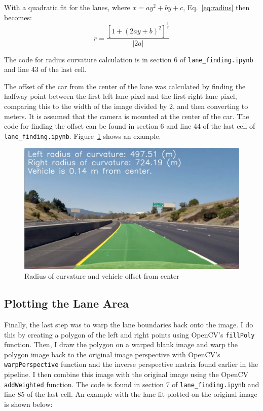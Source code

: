 \documentclass[12pt]{article}
\begin{document}
With a quadratic fit for the lanes, where $x = ay^2 + by + c$, Eq.~\ref{eq:radius} then becomes:
\begin{equation}
r = \frac{[1+(2ay + b)^2]^\frac{3}{2}}{|2a|}
\end{equation}

The code for radius curvature calculation is in section 6 of \texttt{lane\_finding.ipynb} and line 43 of the last cell.

The offset of the car from the center of the lane was calculated by finding the halfway point between the first left lane pixel and the first right lane pixel, comparing this to the width of the image divided by 2, and then converting to meters. It is assumed that the camera is mounted at the center of the car. The code for finding the offset can be found in section 6 and line 44 of the last cell of \texttt{lane\_finding.ipynb}. Figure~\ref{fig:radius_offset} shows an example.

\begin{figure}[h]
\centering
\includegraphics[scale=0.25]{curvature_and_offset.png}
\caption{Radius of curvature and vehicle offset from center}
\label{fig:radius_offset}
\end{figure}

\subsection{Plotting the Lane Area}
Finally, the last step was to warp the lane boundaries back onto the image. I do this by creating a polygon of the left and right points using OpenCV's \texttt{fillPoly} function. Then, I draw the polygon on a warped blank image and warp the polygon image back to the original image perspective with OpenCV's \texttt{warpPerspective} function and the inverse perspective matrix found earlier in the pipeline. I then combine this image with the original image using the OpenCV \texttt{addWeighted} function. The code is found in section 7 of \texttt{lane\_finding.ipynb} and line 85 of the last cell. An example with the lane fit plotted on the original image is shown below:
\end{document}
